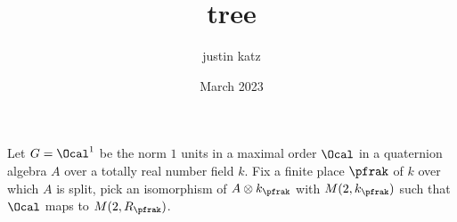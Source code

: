 \documentclass{article}
\title{tree}
\author{justin katz}
\date{March 2023}
\begin{document}
Let $G = \Ocal^1$ be the norm $1$ units in a maximal order $\Ocal$ in a quaternion algebra $A$ over a totally real number field $k$. Fix a finite place $\pfrak$ of $k$ over which $A$ is split, pick an isomorphism of $A\otimes k_\pfrak$ with $M(2,k_\pfrak)$ such that $\Ocal$ maps to $M(2,R_\pfrak)$. 





\end{document}
